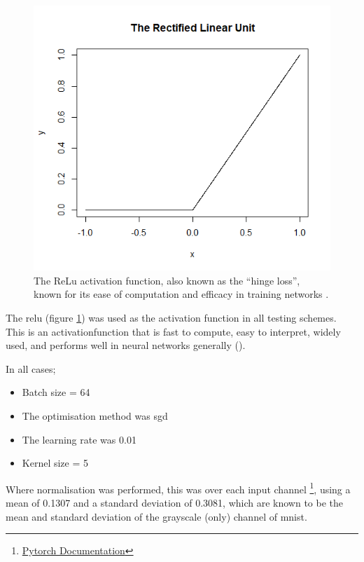 \begin{figure}
    \centering
    \includegraphics[scale=0.5]{figs/relu.png}
    \caption[The ReLu activation function.]{The ReLu activation function, also known as the \enquote{hinge loss}, known for its ease of computation and efficacy in training networks \cite{activation_search}.}
    \label{fig:relu_function}
\end{figure}

The \gls{relu} (figure \ref{fig:relu_function}) was used as the activation function in all testing schemes. This is an \gls{activationfunction} that is fast to compute, easy to interpret, widely used, and performs well in neural networks generally (\cite{activation_search}). 
\bigskip

In all cases;

\begin{itemize}
    \itemsep-1em 
    \item Batch size = 64
    \item The optimisation method was \gls{sgd}
    \item The learning rate was 0.01
    \item Kernel size = 5
\end{itemize}

Where normalisation was performed, this was over each input channel \footnote{\href{https://pytorch.org/docs/stable/torchvision/transforms.html}{Pytorch Documentation}}, using a mean of 0.1307 and a standard deviation of 0.3081, which are known to be the mean and standard deviation of the grayscale (only) channel of \gls{mnist}.

